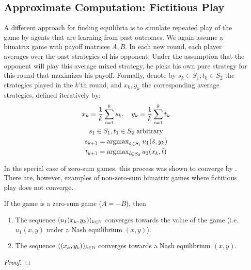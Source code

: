 \documentclass[a4paper]{scrreprt}
\begin{document}
    \subsection{Approximate Computation: Fictitious Play}
    A different approach for finding equilibria is to simulate repeated play of the game by agents that are learning from past outcomes.
    We again assume a bimatrix game with payoff matrices $A, B$.
    In each new round, each player averages over the past strategies of his opponent. Under the assumption that the opponent will play this average mixed strategy, he picks his own pure strategy for this round that maximizes his payoff. Formally, denote by $s_k \in S_1, t_k \in S_2$ the strategies played in the $k$'th round, and $x_k, y_k$ the corresponding average strategies, defined iteratively by:
    \begin{gather*}
        x_k = \frac{1}{k} \sum_{i=1}^{k} s_k, \quad y_k = \frac{1}{k} \sum_{i=1}^{k} t_k \\
        s_1 \in S_1, t_1 \in S_2 \text{ arbitrary} \\
        s_{k+1} = \argmax\limits_{\tilde{s} \in S_1} u_1(\tilde{s}, y_k) \\ %
        t_{k+1} = \argmax\limits_{\tilde{t} \in S_2} u_2(x_k, \tilde{t})
    \end{gather*}
    
    In the special case of zero-sum games, this process was shown to converge by \cite{bib:robinsonFictitiousPlay}.
    There are, however, examples of non-zero-sum bimatrix games where fictitious play does not converge.
    
    \begin{thm}
        If the game is a zero-sum game ($A=-B$), then 
        \begin{enumerate}
            \item The sequence $(u_1(x_k, y_k))_{k \in \mathbb{N}}$ converges towards the value of the game (i.e. $u_1(x, y)$ under a Nash equilibrium $(x, y)$).
            \item The sequence $((x_k, y_k))_{k \in \mathbb{N}}$ converges towards a Nash equilibrium $(x, y)$.
        \end{enumerate}
    \end{thm}
    \begin{proof}
    \end{proof}
\end{document}
